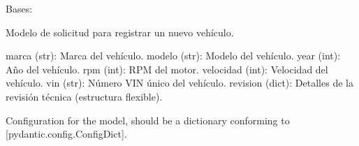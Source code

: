 \documentclass[letterpaper,10pt,spanish]{sphinxmanual}
\begin{document}

\begin{fulllineitems}
\label{\detokenize{endpoints:main.VehiculoRegistro}}
\pysigstartsignatures
\pysiglinewithargsret
{}
{\sphinxparamcomma {}\sphinxparamcomma {}\sphinxparamcomma {}\sphinxparamcomma {}\sphinxparamcomma {}\sphinxparamcomma {}\sphinxparamcomma {}}
{}
\pysigstopsignatures
\sphinxAtStartPar
Bases: 

\sphinxAtStartPar
Modelo de solicitud para registrar un nuevo vehículo.
\begin{description}
\sphinxAtStartPar
marca (str): Marca del vehículo.
modelo (str): Modelo del vehículo.
year (int): Año del vehículo.
rpm (int): RPM del motor.
velocidad (int): Velocidad del vehículo.
vin (str): Número VIN único del vehículo.
revision (dict): Detalles de la revisión técnica (estructura flexible).

\end{description}

\begin{fulllineitems}
\label{\detokenize{endpoints:main.VehiculoRegistro.marca}}
\pysigstartsignatures
\pysigline
{}
\pysigstopsignatures
\end{fulllineitems}


\begin{fulllineitems}
\label{\detokenize{endpoints:main.VehiculoRegistro.model_config}}
\pysigstartsignatures
\pysigline
{}
\pysigstopsignatures
\sphinxAtStartPar
Configuration for the model, should be a dictionary conforming to {[}\sphinxtitleref{ConfigDict}{]}{[}pydantic.config.ConfigDict{]}.


\end{fulllineitems}
\end{fulllineitems}
\end{document}
